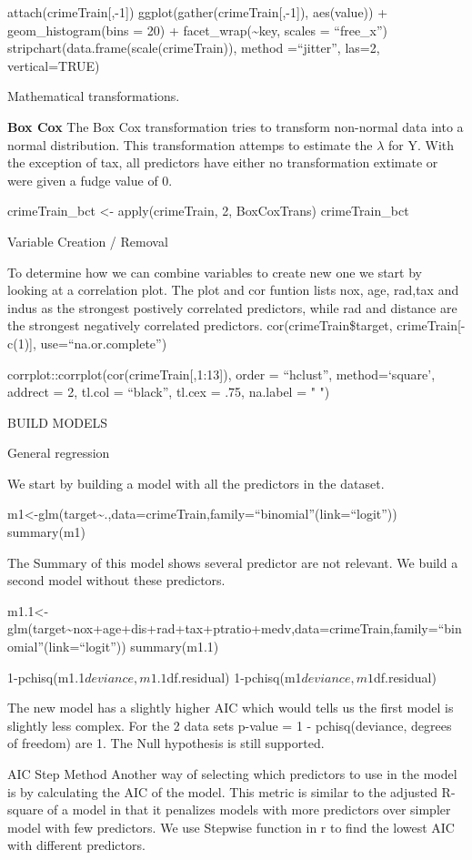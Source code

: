 \documentclass[
]{article}
\begin{document}
attach(crimeTrain{[},-1{]}) ggplot(gather(crimeTrain{[},-1{]}),
aes(value)) + geom\_histogram(bins = 20) +
facet\_wrap(\textasciitilde key, scales = ``free\_x'')
stripchart(data.frame(scale(crimeTrain)), method =``jitter'', las=2,
vertical=TRUE)

Mathematical transformations.

\textbf{Box Cox} The Box Cox transformation tries to transform
non-normal data into a normal distribution. This transformation attemps
to estimate the \(\lambda\) for Y. With the exception of tax, all
predictors have either no transformation extimate or were given a fudge
value of 0.

crimeTrain\_bct \textless- apply(crimeTrain, 2, BoxCoxTrans)
crimeTrain\_bct

Variable Creation / Removal

To determine how we can combine variables to create new one we start by
looking at a correlation plot. The plot and cor funtion lists nox, age,
rad,tax and indus as the strongest postively correlated predictors,
while rad and distance are the strongest negatively correlated
predictors. cor(crimeTrain\$target, crimeTrain{[}-c(1){]},
use=``na.or.complete'')

corrplot::corrplot(cor(crimeTrain{[},1:13{]}), order = ``hclust'',
method=`square', addrect = 2, tl.col = ``black'', tl.cex = .75, na.label
= " ")

BUILD MODELS

General regression

We start by building a model with all the predictors in the dataset.

m1\textless-glm(target\textasciitilde.,data=crimeTrain,family=``binomial''(link=``logit''))
summary(m1)

The Summary of this model shows several predictor are not relevant. We
build a second model without these predictors.

m1.1\textless-glm(target\textasciitilde nox+age+dis+rad+tax+ptratio+medv,data=crimeTrain,family=``binomial''(link=``logit''))
summary(m1.1)

1-pchisq(m1.1\(deviance,m1.1\)df.residual)
1-pchisq(m1\(deviance,m1\)df.residual)

The new model has a slightly higher AIC which would tells us the first
model is slightly less complex. For the 2 data sets p-value = 1 -
pchisq(deviance, degrees of freedom) are 1. The Null hypothesis is still
supported.

AIC Step Method Another way of selecting which predictors to use in the
model is by calculating the AIC of the model. This metric is similar to
the adjusted R-square of a model in that it penalizes models with more
predictors over simpler model with few predictors. We use Stepwise
function in r to find the lowest AIC with different predictors.
\end{document}
